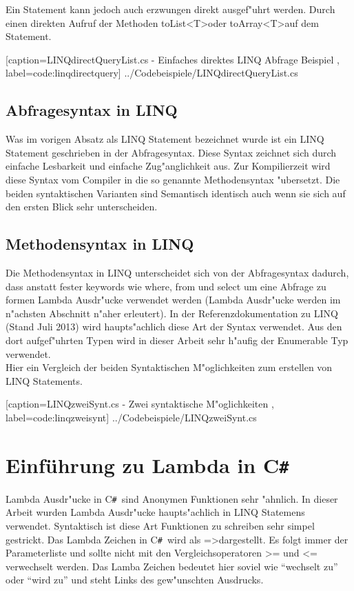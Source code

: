 \documentclass[pagesize, paper=a4, fontsize=12pt,titlepage=true, headings=small, headnosepline, abstractoff, liststotoc, nochapterprefix, plainheadsepline]{scrreprt}
\newcommand{\CS}{C\texttt{\#}}
\newcommand{\CSS}{C\texttt{\# }}
\newcommand{\GTS}{\textless T\textgreater\space}
\newcommand{\LAM}{ =\textgreater\space}
\begin{document}
Ein Statement kann jedoch auch erzwungen direkt ausgef"uhrt werden. Durch einen direkten Aufruf der Methoden toList\GTS oder toArray\GTS auf dem Statement.

			[caption={LINQdirectQueryList.cs - Einfaches direktes LINQ Abfrage Beispiel} \protect\cite{MicrosoftCReferenz.2013}, label=code:linqdirectquery]
			{../Codebeispiele/LINQdirectQueryList.cs}
		\subsection {Abfragesyntax in LINQ}
		Was im vorigen Absatz als LINQ Statement bezeichnet wurde ist ein LINQ Statement geschrieben in der Abfragesyntax. Diese Syntax zeichnet sich durch einfache Lesbarkeit und einfache Zug"anglichkeit aus. Zur Kompilierzeit wird diese Syntax vom Compiler in die so genannte Methodensyntax "ubersetzt. Die beiden syntaktischen Varianten sind Semantisch identisch auch wenn sie sich auf den ersten Blick sehr unterscheiden.
		\subsection {Methodensyntax in LINQ}
		Die Methodensyntax in LINQ unterscheidet sich von der Abfragesyntax dadurch, dass anstatt fester keywords wie where, from und select um eine Abfrage zu formen Lambda Ausdr"ucke verwendet werden (Lambda Ausdr"ucke werden im n"achsten Abschnitt n"aher erleutert). In der Referenzdokumentation zu LINQ (Stand Juli 2013) \cite{MicrosoftCReferenz.2013} wird haupts"achlich diese Art der Syntax verwendet. Aus den dort aufgef"uhrten Typen wird in dieser Arbeit sehr h"aufig der Enumerable Typ verwendet.
\\
Hier ein Vergleich der beiden Syntaktischen M"oglichkeiten zum erstellen von LINQ Statements.

			[caption={LINQzweiSynt.cs - Zwei syntaktische M"oglichkeiten} \protect\cite{MicrosoftCReferenz.2013}, label=code:linqzweisynt]
			{../Codebeispiele/LINQzweiSynt.cs}
	\section {Einführung zu Lambda in \CS}
		Lambda Ausdr"ucke in \CSS sind Anonymen Funktionen sehr "ahnlich. In dieser Arbeit wurden Lambda Ausdr"ucke haupts"achlich in LINQ Statemens verwendet. Syntaktisch ist diese Art Funktionen zu schreiben sehr simpel gestrickt. Das Lambda Zeichen in \CSS wird als \LAM dargestellt. Es folgt immer der Parameterliste und sollte nicht mit den Vergleichsoperatoren \textgreater = und \textless = verwechselt werden. Das Lamba Zeichen bedeutet hier soviel wie "`wechselt zu"' oder "`wird zu"' und steht Links des gew"unschten Ausdrucks.
\end{document}
